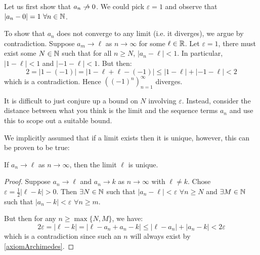 \documentclass[../main.tex]{subfiles}
\begin{document}
\begin{example}
\begin{enumerate}
\begin{center}
      \end{center}
      Let us first show that $a_n \centernot\to 0$.
      We could pick $\varepsilon = 1$ and observe that $|a_n - 0| = 1\ \forall n \in \mathbb{N}$.

      To show that $a_n$ does not converge to any limit (i.e. it diverges), we argue by contradiction.
      Suppose $a_m \to \ell$ as $n \to \infty$ for some $\ell \in \mathbb{R}$.
      Let $\varepsilon = 1$, there must exist some $N \in \mathbb{N}$ such that for all $n \geq N$, $|a_n - \ell| < 1$.
      In particular, $|1 - \ell| < 1$ and $|-1 - \ell| < 1$.
      But then:
      \[
        2 = |1 - (-1)| = |1 - \ell + \ell - (-1)| \leq |1 - \ell| + |-1 - \ell| < 2
      \]
      which is a contradiction.
      Hence $((-1)^{n})^{\infty}_{n = 1}$ diverges.
  \end{enumerate}
\end{example}
\begin{remark}[Advice]
  It is difficult to just conjure up a bound on $N$ involving $\varepsilon$.
  Instead, consider the distance between what you think is the limit and the sequence terms $a_n$ and use this to scope out a suitable bound.
\end{remark}
We implicitly assumed that if a limit exists then it is unique, however, this can be proven to be true:
\begin{proposition}
  If $a_n \to \ell$ as $n \to \infty$, then the limit $\ell$ is unique.
\end{proposition}
\begin{proof}
  Suppose $a_n \to \ell$ and $a_n \to k$ as $n \to \infty$ with $\ell \neq k$.
  Chose $\varepsilon = \frac{1}{2}|\ell - k| > 0$.
  Then $\exists N \in \mathbb{N}$ such that $|a_n - \ell| < \varepsilon$  $\forall n \geq N$ and $\exists M \in \mathbb{N}$ such that $|a_n - k| < \varepsilon$ $\forall n \geq m$.

  But then for any $n \geq \max\{N, M\}$, we have:
  \[
    2\varepsilon = |\ell - k| = |\ell - a_n + a_n - k| \leq |\ell - a_n| + |a_n - k| < 2\varepsilon
  \]
  which is a contradiction since such an $n$ will always exist by \cref{axiomArchimedes}.
\end{proof}
\end{document}
